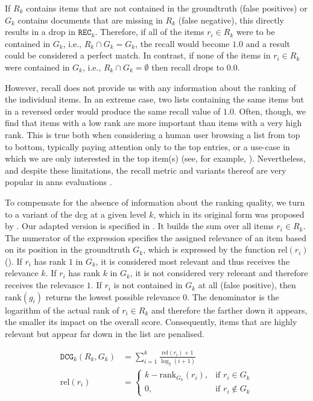 If $R_k$ contains items that are not contained in the groundtruth (false positives) or $G_k$ contains documents that are missing in $R_k$ (false negative), this directly results in a drop in $\texttt{REC}_k$. Therefore, if all of the items $r_i \in R_k$ were to be contained in $G_k$, i.e., $R_k \cap G_k = G_k$, the recall would become $1.0$ and a result could be considered a perfect match. In contrast, if none of the items in $r_i \in R_k$ were contained in $G_k$, i.e., $R_k \cap G_k = \emptyset$ then recall drops to $0.0$. 

However, recall does not provide us with any information about the ranking of the individual items. In an extreme case, two lists containing the same items but in a reversed order would produce the same recall value of $1.0$. Often, though, we find that items with a low rank are more important than items with a very high rank. This is true both when considering a human user browsing a list from top to bottom, typically paying attention only to the top entries, or a use-case in which we are only interested in the top item(s) (see, for example, ). Nevertheless, and despite these limitations, the recall metric and variants thereof are very popular in \acrshort{anns} evaluations \cite{Aumueller:2017ANN,Simhadri:2022Results}. 

To compensate for the absence of information about the ranking quality, we turn to a variant of the \acrshort{dcg} at a given level $k$, which in its original form was proposed by \cite{Jarvelin:2002Cumulated}. Our adapted version is specified in . It builds the sum over all items $r_i \in R_k$. The numerator of the expression specifies the assigned relevance of an item based on its position in the groundtruth $G_k$, which is expressed by the function $\text{rel} (r_i)$ (). If $r_i$ has rank $1$ in $G_k$, it is considered most relevant and thus receives the relevance $k$. If $r_i$ has rank $k$ in $G_k$, it is not considered very releeant and therefore receives the relevance $1$. If $r_i$ is not contained in $G_k$ at all (false positive), then $\text{rank} (g_i)$ returns the lowest possible relevance $0$. The denominator is the logarithm of the actual rank of $r_i \in R_k$ and therefore the farther down it appears, the smaller its impact on the overall score. Consequently, items that are highly relevant but appear far down in the list are penalised.

\begin{align}
\label{equation:dcg}
\mathtt{DCG}_k (R_k, G_k) &= \sum_{i = 1}^{k} \frac{\text{rel}(r_i) + 1}{\log_2(i + 1)} \\
\label{equation:dcg_rel}
\text{rel} (r_i) &= 
    \begin{cases}
        k - \text{rank}_{G_k}(r_i), &  \text{if } r_i \in G_k \\
        0,                          &  \text{if } r_i \notin G_k
    \end{cases}
\end{align}

